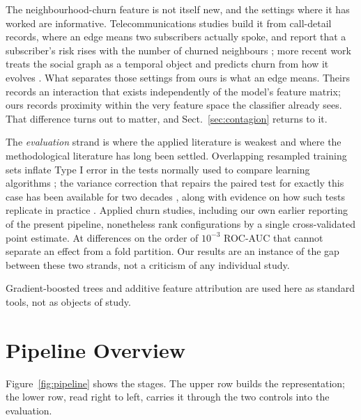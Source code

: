 \documentclass[runningheads]{llncs}
\begin{document}
The neighbourhood-churn feature is not itself new, and the settings where it has
worked are informative. Telecommunications studies build it from call-detail
records, where an edge means two subscribers actually spoke, and report that a
subscriber's risk rises with the number of churned neighbours
\cite{kostic2020socialnetwork}; more recent work treats the social graph as a
temporal object and predicts churn from how it evolves
\cite{lee2025tempodegraphnet}. What separates those settings from ours is what an
edge means. Theirs records an interaction that exists independently of the
model's feature matrix; ours records proximity within the very feature space the
classifier already sees. That difference turns out to matter, and
Sect.~\ref{sec:contagion} returns to it.

The \emph{evaluation} strand is where the applied literature is weakest and where
the methodological literature has long been settled. Overlapping resampled
training sets inflate Type I error in the tests normally used to compare learning
algorithms \cite{dietterich1998approximate}; the variance correction that repairs
the paired test for exactly this case has been available for two decades
\cite{nadeau2003inference}, along with evidence on how such tests replicate in
practice \cite{bouckaert2004replicability,demsar2006statistical}. Applied churn
studies, including our own earlier reporting of the present pipeline,
nonetheless rank configurations by a single cross-validated point estimate. At
differences on the order of $10^{-3}$ ROC-AUC that cannot separate an effect from
a fold partition. Our results are an instance of the gap between these two
strands, not a criticism of any individual study.

Gradient-boosted trees \cite{chen2016xgboost,ke2017lightgbm} and additive feature
attribution \cite{lundberg2017shap} are used here as standard tools, not as
objects of study.

\section{Pipeline Overview}

Figure~\ref{fig:pipeline} shows the stages. The upper row builds the
representation; the lower row, read right to left, carries it through the two
controls into the evaluation.
\end{document}
